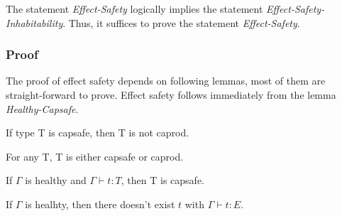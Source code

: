 The statement \emph{Effect-Safety} logically implies the statement
\emph{Effect-Safety-Inhabitability}. Thus, it suffices to prove the
statement \emph{Effect-Safety}.

\subsubsection{Proof}

The proof of effect safety depends on following lemmas, most of them
are straight-forward to prove. Effect safety follows immediately from
the lemma \emph{Healthy-Capsafe}.


\begin{lemma}
 If type T is capsafe, then T is not caprod.
\end{lemma}

\begin{lemma}
 For any T, T is either capsafe or caprod.
\end{lemma}



\begin{lemma}
  If $\Gamma$ is healthy and $\Gamma \vdash t : T$, then T is capsafe.
\end{lemma}

\begin{theorem}
  If $\Gamma$ is healhty, then there doesn't exist $t$ with
  $\Gamma \vdash t : E$.
\end{theorem}


